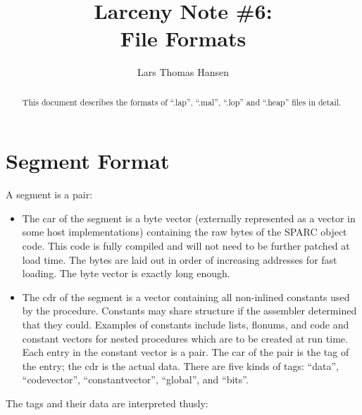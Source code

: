 


\title{Larceny Note \#6: \\
       File Formats}
\author{Lars Thomas Hansen}


\maketitle

\begin{abstract}
This document describes the formats of ``.lap'', ``.mal'', ``.lop'' and
``.heap'' files in detail.
\end{abstract}

\section{Segment Format}

A segment is a pair:

\begin{itemize}
\item
The car of the segment is a byte vector (externally represented as a
vector in some host implementations) containing the raw bytes of the
SPARC object code. This code is fully compiled and will not need to be
further patched at load time. The bytes are laid out in order of increasing
addresses for fast loading. The byte vector is exactly long enough.

\item
The cdr of the segment is a vector containing all non-inlined constants
used by the procedure. Constants may share structure if the assembler
determined that they could. Examples of constants include lists, flonums, 
and code and constant vectors for nested procedures which are to be created
at run time. Each entry in the constant vector is a pair. The car of the
pair is the tag of the entry; the cdr is the actual data. There are five
kinds of tags: ``data'', ``codevector'', ``constantvector'', ``global'',
and ``bits''. 

\end{itemize}

The tags and their data are interpreted thusly:

